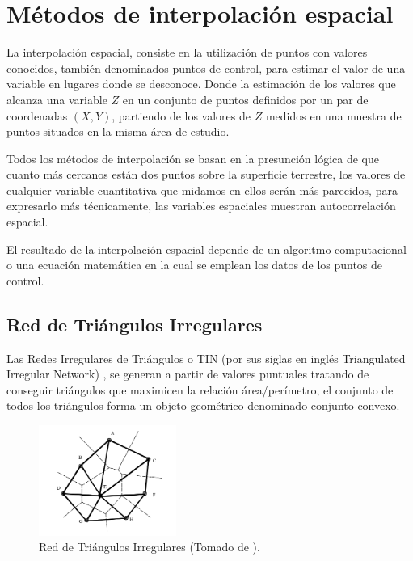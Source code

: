\section{Métodos de interpolación espacial}
\label{sec:cap2-metodos-interpolacion}
La interpolación espacial, consiste en la utilización de puntos con valores conocidos, también
denominados puntos de control, para estimar el valor de una variable en lugares donde se
desconoce. Donde la estimación de los valores que alcanza una variable $Z$ en un conjunto de
puntos definidos por un par de coordenadas $(X,Y)$, partiendo de los valores de $Z$ medidos en
una muestra de puntos situados en la misma área de estudio\cite{fAlonsoSig2006}.

Todos los métodos de interpolación se basan en la presunción lógica de que cuanto más cercanos
están dos puntos sobre la superficie terrestre, los valores de cualquier variable cuantitativa que
midamos en ellos serán más parecidos, para expresarlo más técnicamente, las variables espaciales
muestran autocorrelación espacial\cite{fAlonsoSig2006}.

El resultado de la interpolación espacial depende de un algoritmo computacional o una ecuación
matemática en la cual se emplean los datos de los puntos de control\cite{NINO2011}.

\subsection {Red de Triángulos Irregulares}
Las Redes Irregulares de Triángulos o TIN (por sus siglas en inglés Triangulated Irregular Network)
, se generan a partir de valores puntuales tratando de conseguir triángulos que maximicen la
relación área/perímetro, el conjunto de todos los triángulos forma un objeto geométrico
denominado conjunto convexo\cite{fAlonsoSig2006}.

\begin{figure}[!htbp]
\centering
\includegraphics[width=0.4\textwidth]{capitulo-2/graphics/TIN-cPachecoMDE2003.png}
\caption{\label{fig:sig-tin}Red de Triángulos Irregulares (Tomado de \cite{cPachecoMDE2003}).}
\end{figure}

